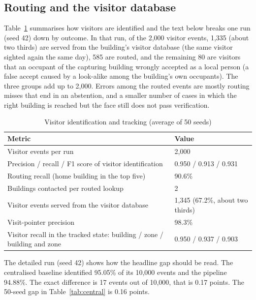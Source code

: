 \documentclass[12pt,a4paper,oneside]{report}
\begin{document}
\subsection{Routing and the visitor database}\label{sec:res-visitors}
Table~\ref{tab:visitors} summarises how visitors are identified and the text below breaks one run (seed 42) down by outcome. In that run, of the 2,000 visitor events, 1,335 (about two thirds) are served from the building's visitor database (the same visitor sighted again the same day), 585 are routed, and the remaining 80 are visitors that an occupant of the capturing building wrongly accepted as a local person (a false accept caused by a look-alike among the building's own occupants). The three groups add up to 2,000. Errors among the routed events are mostly routing misses that end in an abstention, and a smaller number of cases in which the right building is reached but the face still does not pass verification.

\begin{table}[htbp]
\centering
\caption{Visitor identification and tracking (average of 50 seeds)}\label{tab:visitors}
{\small\setlength{\tabcolsep}{4pt}\renewcommand{\arraystretch}{1.2}
\begin{tabular}{|p{8.4cm}|p{3.0cm}|}\hline
\textbf{Metric} & \textbf{Value}\\\hline
Visitor events per run & 2,000\\\hline
Precision / recall / F1 score of visitor identification & 0.950 / 0.913 / 0.931\\\hline
Routing recall (home building in the top five) & 90.6\%\\\hline
Buildings contacted per routed lookup & 2\\\hline
Visitor events served from the visitor database & 1,345 (67.2\%, about two thirds)\\\hline
Visit-pointer precision & 98.3\%\\\hline
Visitor recall in the tracked state: building / zone / building and zone & 0.950 / 0.937 / 0.903\\\hline
\end{tabular}}
\end{table}

The detailed run (seed 42) shows how the headline gap should be read. The centralised baseline identified 95.05\% of its 10,000 events and the pipeline 94.88\%. The exact difference is 17 events out of 10,000, that is 0.17 points. The 50-seed gap in Table~\ref{tab:central} is 0.16 points.
\end{document}
